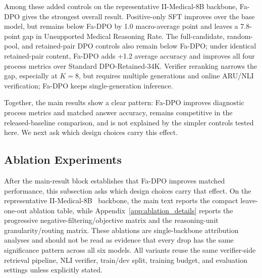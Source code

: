 \documentclass[a4paper,fleqn,doubleblind]{cas-sc}
\begin{document}
Among these added controls on the representative II-Medical-8B backbone, Fa-DPO gives the strongest overall result. Positive-only SFT improves over the base model, but remains below Fa-DPO by 1.0 macro-average point and leaves a 7.8-point gap in Unsupported Medical Reasoning Rate. The full-candidate, random-pool, and retained-pair DPO controls also remain below Fa-DPO; under identical retained-pair content, Fa-DPO adds +1.2 average accuracy and improves all four process metrics over Standard DPO-Retained-34K. Verifier reranking narrows the gap, especially at $K=8$, but requires multiple generations and online ARU/NLI verification; Fa-DPO keeps single-generation inference.

\noindent Together, the main results show a clear pattern: Fa-DPO improves diagnostic process metrics and matched answer accuracy, remains competitive in the released-baseline comparison, and is not explained by the simpler controls tested here. We next ask which design choices carry this effect.

\subsection{Ablation Experiments}
\label{sec:ablation}

After the main-result block establishes that Fa-DPO improves matched performance, this subsection asks which design choices carry that effect. On the representative II-Medical-8B~\cite{intelligentinternet2025iimedical8b} backbone, the main text reports the compact leave-one-out ablation table, while Appendix~\ref{app:ablation_details} reports the progressive negative-filtering/objective matrix and the reasoning-unit granularity/routing matrix. These ablations are single-backbone attribution analyses and should not be read as evidence that every drop has the same significance pattern across all six models. All variants reuse the same verifier-side retrieval pipeline, NLI verifier, train/dev split, training budget, and evaluation settings unless explicitly stated.
\end{document}

